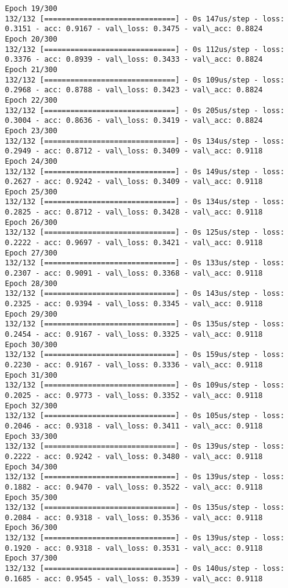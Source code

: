 \documentclass[11pt]{article}
\begin{document}
\begin{Verbatim}[commandchars=\\\{\}]
Epoch 19/300
132/132 [==============================] - 0s 147us/step - loss: 0.3151 - acc: 0.9167 - val\_loss: 0.3475 - val\_acc: 0.8824
Epoch 20/300
132/132 [==============================] - 0s 112us/step - loss: 0.3376 - acc: 0.8939 - val\_loss: 0.3433 - val\_acc: 0.8824
Epoch 21/300
132/132 [==============================] - 0s 109us/step - loss: 0.2968 - acc: 0.8788 - val\_loss: 0.3423 - val\_acc: 0.8824
Epoch 22/300
132/132 [==============================] - 0s 205us/step - loss: 0.3004 - acc: 0.8636 - val\_loss: 0.3419 - val\_acc: 0.8824
Epoch 23/300
132/132 [==============================] - 0s 134us/step - loss: 0.2949 - acc: 0.8712 - val\_loss: 0.3409 - val\_acc: 0.9118
Epoch 24/300
132/132 [==============================] - 0s 149us/step - loss: 0.2627 - acc: 0.9242 - val\_loss: 0.3409 - val\_acc: 0.9118
Epoch 25/300
132/132 [==============================] - 0s 134us/step - loss: 0.2825 - acc: 0.8712 - val\_loss: 0.3428 - val\_acc: 0.9118
Epoch 26/300
132/132 [==============================] - 0s 125us/step - loss: 0.2222 - acc: 0.9697 - val\_loss: 0.3421 - val\_acc: 0.9118
Epoch 27/300
132/132 [==============================] - 0s 133us/step - loss: 0.2307 - acc: 0.9091 - val\_loss: 0.3368 - val\_acc: 0.9118
Epoch 28/300
132/132 [==============================] - 0s 143us/step - loss: 0.2325 - acc: 0.9394 - val\_loss: 0.3345 - val\_acc: 0.9118
Epoch 29/300
132/132 [==============================] - 0s 135us/step - loss: 0.2454 - acc: 0.9167 - val\_loss: 0.3325 - val\_acc: 0.9118
Epoch 30/300
132/132 [==============================] - 0s 159us/step - loss: 0.2230 - acc: 0.9167 - val\_loss: 0.3336 - val\_acc: 0.9118
Epoch 31/300
132/132 [==============================] - 0s 109us/step - loss: 0.2025 - acc: 0.9773 - val\_loss: 0.3352 - val\_acc: 0.9118
Epoch 32/300
132/132 [==============================] - 0s 105us/step - loss: 0.2046 - acc: 0.9318 - val\_loss: 0.3411 - val\_acc: 0.9118
Epoch 33/300
132/132 [==============================] - 0s 139us/step - loss: 0.2222 - acc: 0.9242 - val\_loss: 0.3480 - val\_acc: 0.9118
Epoch 34/300
132/132 [==============================] - 0s 139us/step - loss: 0.1882 - acc: 0.9470 - val\_loss: 0.3522 - val\_acc: 0.9118
Epoch 35/300
132/132 [==============================] - 0s 135us/step - loss: 0.2084 - acc: 0.9318 - val\_loss: 0.3536 - val\_acc: 0.9118
Epoch 36/300
132/132 [==============================] - 0s 139us/step - loss: 0.1920 - acc: 0.9318 - val\_loss: 0.3531 - val\_acc: 0.9118
Epoch 37/300
132/132 [==============================] - 0s 140us/step - loss: 0.1685 - acc: 0.9545 - val\_loss: 0.3539 - val\_acc: 0.9118

\end{Verbatim}
\end{document}
